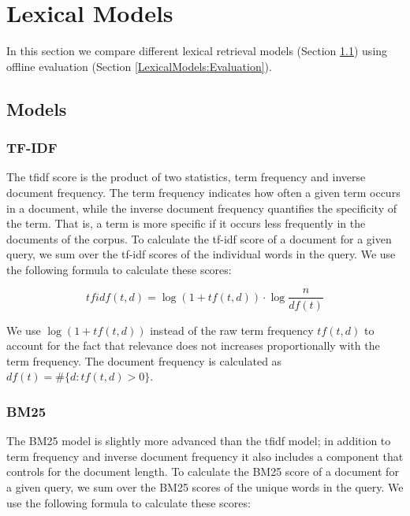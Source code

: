 \section{Lexical Models}

In this section we compare different lexical retrieval models
(Section \ref{LexicalModels:Models}) using
offline evaluation (Section \ref{LexicalModels:Evaluation}).

\subsection{Models}
\label{LexicalModels:Models}


\subsubsection{TF-IDF}

The tf\textendash idf score is the product of two statistics, 
term frequency and inverse document frequency.
The term frequency indicates how often a given term occurs in a document,
while the inverse document frequency quantifies the specificity of the term.
That is, a term is more specific if it occurs less frequently in the documents of the corpus.  
%
To calculate the tf-idf score of a document for a given query, 
we sum over the tf-idf scores of the individual words in the query.
We use the following formula to calculate these scores: 

\begin{equation*}
tfidf(t,d) = \log(1 + tf(t,d)) \cdot \log\frac{n}{df(t)}
\end{equation*}

We use $\log(1 + tf(t,d))$ instead of the raw term frequency $tf(t,d)$
to account for the fact that relevance	does not increases proportionally with the term frequency. The document frequency is calculated as $df(t) = \#\{d:tf(t,d) > 0\}$.


\subsubsection{BM25}

The BM25 model is slightly more advanced than the tf\textendash idf model;
in addition to term frequency and inverse document frequency
it also includes a component that controls for the document length.
%
To calculate the BM25 score of a document for a given query, 
we sum over the BM25 scores of the unique words in the query.
We use the following formula to calculate these scores: 

